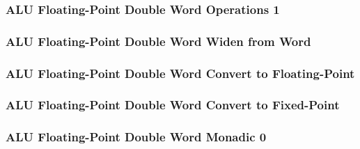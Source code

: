 

\subsubsection[{\small ALU Floating-Point Double Word Operations 1}]{ALU Floating-Point Double Word Operations 1} \label{sec:format-ALU-FDMO1}



\subsubsection[{\small ALU Floating-Point Double Word Widen from Word}]{ALU Floating-Point Double Word Widen from Word} \label{sec:format-ALU-FDWIDEN}



\subsubsection[{\small ALU Floating-Point Double Word Convert to Floating-Point}]{ALU Floating-Point Double Word Convert to Floating-Point} \label{sec:format-ALU-FDFLOAT}



\subsubsection[{\small ALU Floating-Point Double Word Convert to Fixed-Point}]{ALU Floating-Point Double Word Convert to Fixed-Point} \label{sec:format-ALU-FDFIXED}



\subsubsection[{\small ALU Floating-Point Double Word Monadic 0}]{ALU Floating-Point Double Word Monadic 0} \label{sec:format-ALU-FDMO0}



